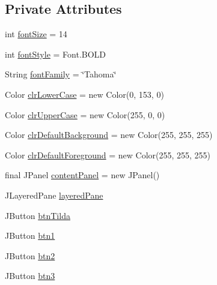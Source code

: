 \subsection*{Private Attributes}
\begin{DoxyCompactItemize}
\item 
int \hyperlink{classcom_1_1lclion_1_1midigui_1_1_dialog_on_screen_keyboard_a78dc3704e7e01da52c9a93a70c5bc45d}{font\+Size} = 14
\item 
int \hyperlink{classcom_1_1lclion_1_1midigui_1_1_dialog_on_screen_keyboard_aec4029056965b8b1d9e30178aa258e71}{font\+Style} = Font.\+B\+O\+L\+D
\item 
String \hyperlink{classcom_1_1lclion_1_1midigui_1_1_dialog_on_screen_keyboard_ab0f8a5a46d90946fe20e323cbc10384f}{font\+Family} = \char`\"{}Tahoma\char`\"{}
\item 
Color \hyperlink{classcom_1_1lclion_1_1midigui_1_1_dialog_on_screen_keyboard_a6213a3fc55162f385ecf68112b98d6cf}{clr\+Lower\+Case} = new Color(0, 153, 0)
\item 
Color \hyperlink{classcom_1_1lclion_1_1midigui_1_1_dialog_on_screen_keyboard_a18bfeb811deb62b61ddeb555174ca785}{clr\+Upper\+Case} = new Color(255, 0, 0)
\item 
Color \hyperlink{classcom_1_1lclion_1_1midigui_1_1_dialog_on_screen_keyboard_a07f32e805fc4b2bb4953e4fc63ac0c3c}{clr\+Default\+Background} = new Color(255, 255, 255)
\item 
Color \hyperlink{classcom_1_1lclion_1_1midigui_1_1_dialog_on_screen_keyboard_aa8736f6d433f5918da7935630e4491d9}{clr\+Default\+Foreground} = new Color(255, 255, 255)
\item 
final J\+Panel \hyperlink{classcom_1_1lclion_1_1midigui_1_1_dialog_on_screen_keyboard_ac383c7b38c74b9e1cc245a00de4fbb5e}{content\+Panel} = new J\+Panel()
\item 
J\+Layered\+Pane \hyperlink{classcom_1_1lclion_1_1midigui_1_1_dialog_on_screen_keyboard_a90de2803c72845b70771d7326d038f45}{layered\+Pane}
\item 
J\+Button \hyperlink{classcom_1_1lclion_1_1midigui_1_1_dialog_on_screen_keyboard_a2d7738272489586031bc93d39302aed9}{btn\+Tilda}
\item 
J\+Button \hyperlink{classcom_1_1lclion_1_1midigui_1_1_dialog_on_screen_keyboard_a2c3163c016e15ebbb4071599c1d15029}{btn1}
\item 
J\+Button \hyperlink{classcom_1_1lclion_1_1midigui_1_1_dialog_on_screen_keyboard_aa093c8b4f751c9c929117324fb2ccb0c}{btn2}
\item 
J\+Button \hyperlink{classcom_1_1lclion_1_1midigui_1_1_dialog_on_screen_keyboard_aaff3703d264eab6c3f736790b6535faa}{btn3}

\end{DoxyCompactItemize}
